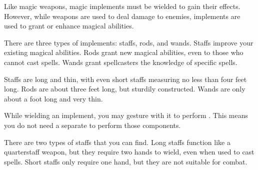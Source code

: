   Like magic weapons, magic implements must be wielded to gain their effects.
  However, while weapons are used to deal damage to enemies, implements are used to grant or enhance magical abilities.

  There are three types of implements: staffs, rods, and wands.
  Staffs improve your existing magical abilities.
  Rods grant new magical abilities, even to those who cannot cast spells.
  Wands grant spellcasters the knowledge of specific spells.

  Staffs are long and thin, with even short staffs measuring no less than four feet long.
  Rods are about three feet long, but sturdily constructed.
  Wands are only about a foot long and very thin.

   While wielding an implement, you may gesture with it to perform .
  This means you do not need a separate  to perform those components.

  There are two types of staffs that you can find.
  Long staffs function like a quarterstaff weapon, but they require two hands to wield, even when used to cast spells.
  Short staffs only require one hand, but they are not suitable for combat.

  \begin{longcolumn}
    
  \end{longcolumn}

  
